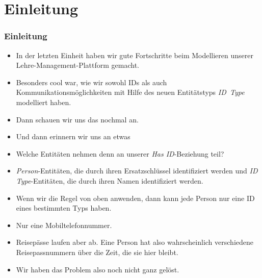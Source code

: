 \documentclass[aspectratio=169,mathserif,notheorems]{beamer}%
\subtitle{30.~Konzeptuelles Schema:~Schwache Entitäten}%
\begin{document}
%
%
\startPresentation%
%
\section{Einleitung}%
%
\begin{frame}[t]%
\frametitle{Einleitung}%
\begin{itemize}%
\item In der letzten Einheit haben wir gute Fortschritte beim Modellieren unserer Lehre-Management-Plattform gemacht.%
\item<2-> Besonders cool war, wie wir sowohl IDs als auch Kommunikationsmöglichkeiten mit Hilfe des neuen Entitätstyps \emph{ID~Type} modelliert haben.%
\item<3-> Dann schauen wir uns das  nochmal an.%
%
\item<4-> Und dann erinnern wir uns an etwas%
\item<5-> Welche Entitäten nehmen denn an unserer \emph{Has ID}-Beziehung teil?%
\item<6-> \emph{Person}-Entitäten, die durch ihren Ersatzschlüssel identifiziert werden und \emph{ID Type}-Entitäten, die durch ihren Namen identifiziert werden.%
\item<7-> Wenn wir die Regel von oben anwenden, dann kann jede Person nur eine ID eines bestimmten Typs haben.%
\item<8-> Nur eine Mobiltelefonnummer.%
%
\item<11-> Reisepässe laufen aber ab. Eine Person hat also wahrscheinlich verschiedene Reisepassnummern über die Zeit, die sie hier bleibt.%
\item<12-> Wir haben das Problem also noch nicht ganz gelöst.%
\end{itemize}%
%
\end{frame}%
%
\end{document}

